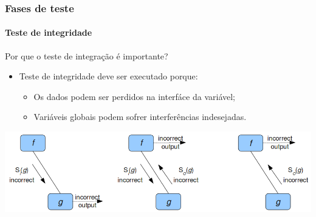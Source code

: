 \begin{frame}
\frametitle{Fases de teste}
\framesubtitle{Teste de integridade}

\begin{block:fact}{Por que o teste de integração é importante?}
\begin{itemize}
	\item Teste de integridade deve ser executado porque:
	\begin{itemize}
		\item Os dados podem ser perdidos na interfáce da variável;

		\item Variáveis globais podem sofrer interferências indesejadas.
	\end{itemize}
\end{itemize}
\end{block:fact}

\begin{block:fact}{}
    \centering
    \includegraphics[width=\textwidth]{teste-de-software/conceitos-basicos/Imagens/types-integration-errors}
\end{block:fact}
\end{frame}



